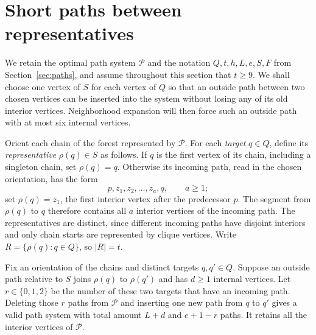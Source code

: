 \section{Short paths between representatives}\label{sec:growth}

We retain the optimal path system $\mathcal P$ and the notation
$Q,t,h,L,e,S,F$ from Section~\ref{sec:paths}, and assume throughout
this section that $t\ge 9$.
We shall choose one vertex of $S$ for each vertex of $Q$ so that an
outside path between two chosen vertices can be inserted into the
system without losing any of its old interior vertices.  Neighborhood
expansion will then force such an outside path with at most six
internal vertices.

Orient each chain of the forest represented by $\mathcal P$.
For each \emph{target} $q\in Q$, define its \emph{representative}
$\rho(q)\in S$ as follows.  If $q$ is the first vertex of its chain,
including a singleton chain, set $\rho(q)=q$.  Otherwise its incoming
path, read in the chosen orientation, has the form
\[
 p,z_1,z_2,\ldots,z_a,q,\qquad a\ge 1;
\]
set $\rho(q)=z_1$, the first interior vertex after the predecessor $p$.
The segment from $\rho(q)$ to $q$ therefore contains all $a$ interior
vertices of the incoming path.  The representatives are distinct,
since different incoming paths have disjoint interiors and only
chain starts are represented by clique vertices.  Write
$R=\{\rho(q):q\in Q\}$, so $|R|=t$.

\begin{lemma}\label{grow:replacement}
Fix an orientation of the chains and distinct targets $q,q'\in Q$.
Suppose an outside path relative to $S$ joins $\rho(q)$ to $\rho(q')$
and has $d\ge 1$ internal vertices.  Let $r\in\{0,1,2\}$ be the number
of these two targets that have an incoming path.
Deleting those $r$ paths from $\mathcal P$ and inserting one new path
from $q$ to $q'$ gives a valid path system with total amount $L+d$
and $e+1-r$ paths.  It retains all the interior vertices of
$\mathcal P$.
\end{lemma}

